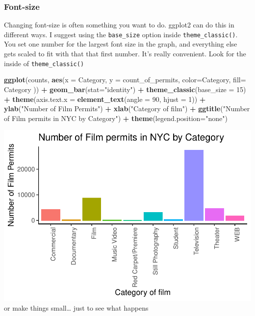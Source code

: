\documentclass[
]{book}
\newenvironment{Shaded}{\begin{snugshade}}{\end{snugshade}}
\newcommand{\AttributeTok}[1]{\textcolor[rgb]{0.13,0.29,0.53}{#1}}
\newcommand{\DecValTok}[1]{\textcolor[rgb]{0.00,0.00,0.81}{#1}}
\newcommand{\FunctionTok}[1]{\textcolor[rgb]{0.13,0.29,0.53}{\textbf{#1}}}
\newcommand{\NormalTok}[1]{#1}
\newcommand{\SpecialCharTok}[1]{\textcolor[rgb]{0.81,0.36,0.00}{\textbf{#1}}}
\newcommand{\StringTok}[1]{\textcolor[rgb]{0.31,0.60,0.02}{#1}}
\begin{document}
\hypertarget{font-size}{%
\subsubsection{Font-size}\label{font-size}}

Changing font-size is often something you want to do. ggplot2 can do this in different ways. I suggest using the \texttt{base\_size} option inside \texttt{theme\_classic()}. You set one number for the largest font size in the graph, and everything else gets scaled to fit with that that first number. It's really convenient. Look for the inside of \texttt{theme\_classic()}

\begin{Shaded}
\begin{Highlighting}[]
\FunctionTok{ggplot}\NormalTok{(counts, }\FunctionTok{aes}\NormalTok{(}\AttributeTok{x =}\NormalTok{ Category, }\AttributeTok{y =}\NormalTok{ count\_of\_permits, }
                   \AttributeTok{color=}\NormalTok{Category, }
                   \AttributeTok{fill=}\NormalTok{ Category )) }\SpecialCharTok{+}
  \FunctionTok{geom\_bar}\NormalTok{(}\AttributeTok{stat=}\StringTok{"identity"}\NormalTok{) }\SpecialCharTok{+} 
  \FunctionTok{theme\_classic}\NormalTok{(}\AttributeTok{base\_size =} \DecValTok{15}\NormalTok{) }\SpecialCharTok{+}
  \FunctionTok{theme}\NormalTok{(}\AttributeTok{axis.text.x =} \FunctionTok{element\_text}\NormalTok{(}\AttributeTok{angle =} \DecValTok{90}\NormalTok{, }\AttributeTok{hjust =} \DecValTok{1}\NormalTok{)) }\SpecialCharTok{+}
  \FunctionTok{ylab}\NormalTok{(}\StringTok{"Number of Film Permits"}\NormalTok{) }\SpecialCharTok{+} 
  \FunctionTok{xlab}\NormalTok{(}\StringTok{"Category of film"}\NormalTok{) }\SpecialCharTok{+}
  \FunctionTok{ggtitle}\NormalTok{(}\StringTok{"Number of Film permits in NYC by Category"}\NormalTok{) }\SpecialCharTok{+}
  \FunctionTok{theme}\NormalTok{(}\AttributeTok{legend.position=}\StringTok{"none"}\NormalTok{) }
\end{Highlighting}
\end{Shaded}

\includegraphics{Statistics_Lab_files/figure-latex/1categoryK-1.pdf}
or make things small\ldots{} just to see what happens
\end{document}

